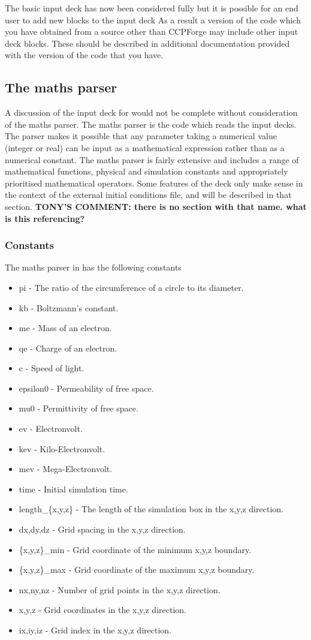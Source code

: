 \documentclass[12pt,a4paper]{article}
\newcommand{\EPOCH}{{\color{warwickdark}\fontfamily{phv}\selectfont{EPOCH}}}
\newcommand{\tony}[1]{{\color{warwickred} \bf{TONY'S COMMENT:} \bf{#1}}\\}
\begin{document}
The basic input deck has now been considered fully but it
 is possible for an end user to add new blocks to the input deck As a result
a version of the code which you have obtained from a source other than
CCPForge may include other input deck blocks. These should be described in
additional documentation provided with the version of the code that you have.

\subsection{The maths parser}
\label{sec:maths_parser}
A discussion of the input deck for {\EPOCH} would not be complete without
consideration of the maths parser. The maths parser is the code which reads
the input decks.
The parser makes it possible that any parameter taking a
numerical value (integer or real) can be input as a mathematical expression
rather than as a numerical constant. The maths parser is fairly extensive and
includes a range of mathematical functions, physical and simulation constants
and appropriately prioritised mathematical operators. Some features of the
deck only make sense in the context of the external initial conditions file,
and will be described in that section.
\tony{there is no section with that name. what is this referencing?}

\subsubsection{Constants}
\label{sec:constants}
The maths parser in {\EPOCH}  has the following constants
\begin{itemize}
\item pi - The ratio of the circumference of a circle to its diameter.
\item kb - Boltzmann's constant.
\item me - Mass of an electron.
\item qe - Charge of an electron.
\item c - Speed of light.
\item epsilon0 - Permeability of free space.
\item mu0 - Permittivity of free space.
\item ev - Electronvolt.
\item kev - Kilo-Electronvolt.
\item mev - Mega-Electronvolt.
\item time - Initial simulation time.
\item length\_\{x,y,z\} - The length of the simulation box in the x,y,z
  direction.
\item dx,dy,dz - Grid spacing in the x,y,z direction.
\item \{x,y,z\}\_min - Grid coordinate of the minimum x,y,z boundary.
\item \{x,y,z\}\_max - Grid coordinate of the maximum x,y,z boundary.
\item nx,ny,nz - Number of grid points in the x,y,z direction.
\item x,y,z - Grid coordinates in the x,y,z direction.
\item ix,iy,iz - Grid index in the x,y,z direction.
\end{itemize}
\end{document}
